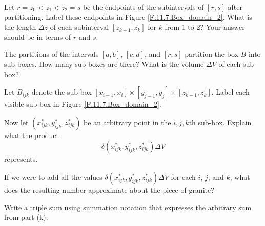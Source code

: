\begin{activity}
	

	\item Let $r=z_0 < z_1 < z_2=s$ be the endpoints of the subintervals of $[r,s]$ after partitioning. Label these endpoints in Figure \ref{F:11.7.Box_domain_2}. What is the length $\Delta z$ of each subinterval $[z_{k-1},z_k]$ for $k$ from 1 to 2? Your answer should be in terms of $r$ and $s$.
	
	

	\item The partitions of the intervals $[a,b]$, $[c,d]$, and $[r,s]$ partition the box $B$ into sub-boxes. How many sub-boxes are there? What is the volume $\Delta V$ of each sub-box?
	
	
	
	\item Let $B_{ijk}$ denote the sub-box $[x_{i-1},x_i] \times [y_{j-1},y_j] \times [z_{k-1},z_k]$. Label each visible sub-box in Figure \ref{F:11.7.Box_domain_2}.
	
	
	
	
	\item Now let $(x_{ijk}^*, y_{ijk}^*, z_{ijk}^*)$ be an arbitrary point in the $i,j,k$th sub-box. Explain what the product
\[\delta(x_{ijk}^*, y_{ijk}^*, z_{ijk}^*) \Delta V\]
represents.



    \item If we were to add all the values $\delta(x_{ijk}^*, y_{ijk}^*, z_{ijk}^*) \Delta V$ for each $i$, $j$, and $k$, what does the resulting number approximate about the piece of granite?

	
	
	\item Write a triple sum using summation notation that expresses the arbitrary sum from part (k).
		
	
	\ea

\end{activity}
\begin{smallhint}

\end{smallhint}
\begin{bighint}

\end{bighint}
